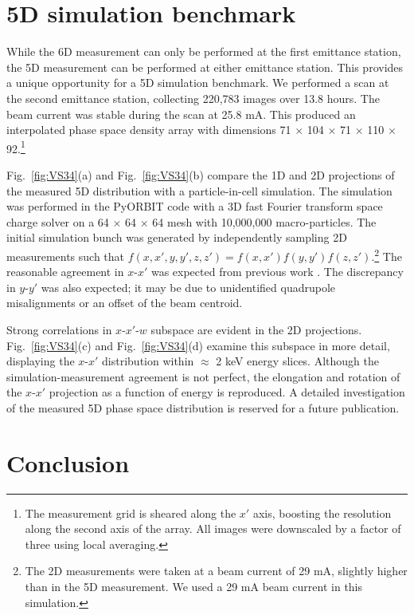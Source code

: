 \documentclass[letterpaper,
               nospread,
               biblatex,
              ]{jacow}
\begin{document}
\section{5D simulation benchmark}

While the 6D measurement can only be performed at the first emittance station, the 5D measurement can be performed at either emittance station. This provides a unique opportunity for a 5D simulation benchmark. We performed a scan at the second emittance station, collecting 220,783 images over 13.8 hours. The beam current was stable during the scan at 25.8 mA. This produced an interpolated phase space density array with dimensions 71 $\times$ 104 $\times$ 71 $\times$ 110 $\times$ 92.\footnote{
    The measurement grid is sheared along the $x'$ axis, boosting the resolution along the second axis of the array. All images were downscaled by a factor of three using local averaging.
} 


Fig.~\ref{fig:VS34}(a) and Fig.~\ref{fig:VS34}(b) compare the 1D and 2D projections of the measured 5D distribution with a particle-in-cell simulation. The simulation was performed in the PyORBIT code with a 3D fast Fourier transform space charge solver on a 64 $\times$ 64 $\times$ 64 mesh with 10,000,000 macro-particles. The initial simulation bunch was generated by independently sampling 2D measurements such that $f(x,x',y,y',z,z') = f(x,x')f(y,y')f(z,z')$.\footnote{
    The 2D measurements were taken at a beam current of 29 mA, slightly higher than in the 5D measurement. We used a 29 mA beam current in this simulation.
} The reasonable agreement in $x$-$x'$ was expected from previous work \cite{Ruisard2021-IPAC}. The discrepancy in $y$-$y'$ was also expected; it may be due to unidentified quadrupole misalignments or an offset of the beam centroid. 

Strong correlations in $x$-$x'$-$w$ subspace are evident in the 2D projections. Fig.~\ref{fig:VS34}(c) and Fig.~\ref{fig:VS34}(d) examine this subspace in more detail, displaying the $x$-$x'$ distribution within $\approx$ 2 keV energy slices. Although the simulation-measurement agreement is not perfect, the elongation and rotation of the $x$-$x'$ projection as a function of energy is reproduced. A detailed investigation of the measured 5D phase space distribution is reserved for a future publication.


\section{Conclusion}
\end{document}
